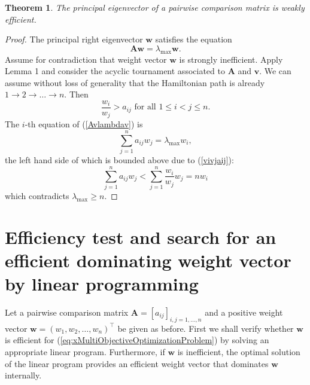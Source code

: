 \documentclass{article}
\theoremstyle{plain}
\newtheorem{theorem}{Theorem}[section]
\begin{document}
\begin{theorem}
The principal eigenvector of a pairwise comparison matrix is weakly ef{\kern0pt}f{\kern0pt}icient.
\end{theorem}
\begin{proof}
The principal right eigenvector $\mathbf{w}$ satisf{\kern0pt}ies the equation
\begin{equation}
\mathbf{A} \mathbf{w} = \lambda_{\max} \mathbf{w}. \label{Avlambdav}    %
\end{equation}
Assume for contradiction that weight vector $\mathbf{w}$ is strongly inef{\kern0pt}f{\kern0pt}icient.
Apply Lemma 1 and consider the acyclic tournament associated to $\mathbf{A}$ and $\mathbf{v}$.
We can assume without loss of generality that the Hamiltonian path is already
$1 \rightarrow 2 \rightarrow \ldots \rightarrow n.$
Then
\begin{equation}
 \frac{w_i}{w_j} > a_{ij} \text{ for all } 1 \leq i < j \leq n.  \label{vivjaij}    %
\end{equation}
The $i$-th equation of (\ref{Avlambdav}) is
\begin{equation}
\sum\limits_{j=1}^{n} a_{ij} w_j = \lambda_{\max} w_i,  \label{Avlambdav-i}    %
\end{equation}
the left hand side of which is bounded above due to (\ref{vivjaij}):
\[
\sum\limits_{j=1}^{n} a_{ij} w_j <  \sum\limits_{j=1}^{n} \frac{w_i}{w_j} w_j = n w_i
\]
which contradicts $\lambda_{\max} \geq n.$
\end{proof}


\section{Ef{\kern0pt}f{\kern0pt}iciency test and search for an ef{\kern0pt}f{\kern0pt}icient dominating weight vector by linear programming}
\label{section:4} %

Let a pairwise comparison matrix
$\mathbf{A} =
\left[
a_{ij}
\right]_{i,j=1,\ldots,n}$ and a positive weight vector
$\mathbf{w} = (w_1, w_2, \ldots, w_n)^{\top}$ be given as before.
First we shall verify whether $\mathbf{w}$ is ef{\kern0pt}f{\kern0pt}icient
for (\ref{eq:xMultiObjectiveOptimizationProblem}) by solving an appropriate linear program.
Furthermore, if $\mathbf{w}$ is inef{\kern0pt}f{\kern0pt}icient, the optimal solution
of the linear program provides an ef{\kern0pt}f{\kern0pt}icient weight vector that dominates $\mathbf{w}$ internally. \\
\end{document}
